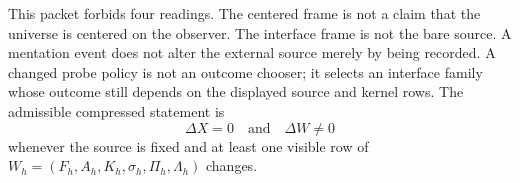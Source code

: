 \begin{remark}
\label{rem:egocentric-interface-mentation-forbidden-readings}
This packet forbids four readings. The centered frame is not a claim that
the universe is centered on the observer. The interface frame is not the
bare source. A mentation event does not alter the external source merely
by being recorded. A changed probe policy is not an outcome chooser; it
selects an interface family whose outcome still depends on the displayed
source and kernel rows. The admissible compressed statement is
$$
\Delta X=0
\quad\text{and}\quad
\Delta W\neq 0
$$
whenever the source is fixed and at least one visible row of
$W_h=(F_h,A_h,K_h,\sigma_h,\Pi_h,\Lambda_h)$ changes.
\end{remark}

